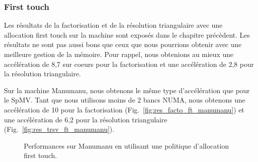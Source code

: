 \subsubsection{First touch}
Les résultats de la factorisation et de la résolution triangulaire avec une allocation first touch sur la machine  sont exposés dans le chapitre précèdent.
%
Les résultats ne sont pas aussi bons que ceux que nous pourrions obtenir avec une meilleure gestion de la mémoire.
%
Pour rappel, nous obtenions au mieux une accélération de 8,7 sur coeurs pour la factorisation et une accélération de 2,8 pour la résolution triangulaire.


Sur la machine Manumanu, nous obtenons le même type d'accélération que pour le SpMV.
%
Tant que nous utilisons moins de 2 bancs NUMA, nous obtenons une accélération de 10 pour la factorisation (Fig.~\ref{fig:res_facto_ft_manumanu}) et une accélération de 6,2 pour la résolution triangulaire (Fig.~\ref{fig:res_trsv_ft_manumanu}).


\begin{figure}[!h]
     \begin{center}
    \end{center}
    \caption{Performances sur Manumanu en utilisant une politique d'allocation first touch.}
\end{figure}
